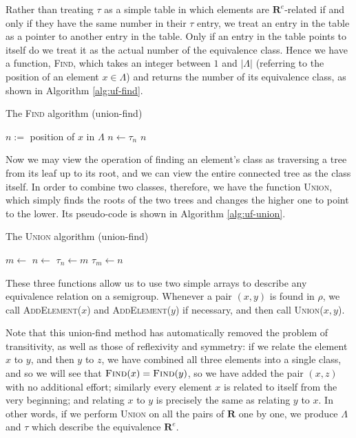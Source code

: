 Rather than treating $\tau$ as a simple table in which elements are
$\mathbf{R}^e$-related if and only if they have the same number in their $\tau$
entry, we treat an entry in the table as a pointer to another entry in the
table.  Only if an entry in the table points to itself do we treat it as the
actual number of the equivalence class.  Hence we have a function,
\textsc{Find}, which takes an integer between $1$ and $|\Lambda|$ (referring to
the position of an element $x \in \Lambda$) and returns the number of its
equivalence class, as shown in Algorithm \ref{alg:uf-find}.

\begin{algorithm}
\caption{The \textsc{Find} algorithm (union-find)}
\label{alg:uf-find}
  \begin{algorithmic}
      \State $n := $ position of $x$ in $\Lambda$
      \Repeat
        \State $n \gets \tau_n$
      \State \Return $n$
    \EndProcedure
  \end{algorithmic}
\end{algorithm}

Now we may view the operation of finding an element's class as traversing a tree
from its leaf up to its root, and we can view the entire connected tree as the
class itself.  In order to combine two classes, therefore, we have the function
\textsc{Union}, which simply finds the roots of the two trees and changes the
higher one to point to the lower.  Its pseudo-code is shown in Algorithm
\ref{alg:uf-union}.

\begin{algorithm}
\caption{The \textsc{Union} algorithm (union-find)}
\label{alg:uf-union}
  \begin{algorithmic}
      \State $m \gets $ 
      \State $n \gets $ 
        \State $\tau_n \gets m$
        \State $\tau_m \gets n$
      \EndIf
    \EndProcedure
  \end{algorithmic}
\end{algorithm}

These three functions allow us to use two simple arrays to describe any
equivalence relation on a semigroup.  Whenever a pair $(x,y)$ is found in
$\rho$, we call \textsc{AddElement($x$)} and \textsc{AddElement($y$)} if
necessary, and then call \textsc{Union($x,y$)}.

Note that this union-find method has automatically removed the problem of
transitivity, as well as those of reflexivity and symmetry: if we relate the
element $x$ to $y$, and then $y$ to $z$, we have combined all three elements
into a single class, and so we will see that
$\textsc{Find}(x) = \textsc{Find}(y)$, so we have added the pair $(x,z)$ with no
additional effort; similarly every element $x$ is related to itself from the
very beginning; and relating $x$ to $y$ is precisely the same as relating $y$ to
$x$.  In other words, if we perform \textsc{Union} on all the pairs of
$\mathbf{R}$ one by one, we produce $\Lambda$ and $\tau$ which describe the
equivalence $\mathbf{R}^e$.

